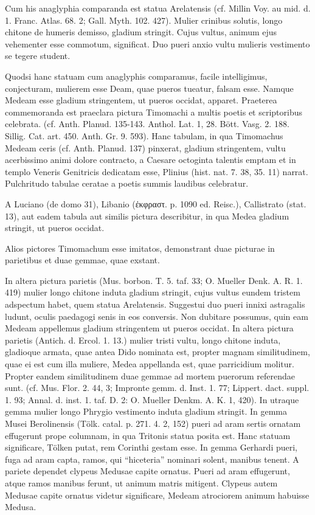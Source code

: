 \documentclass[landscape, a4paper, 11pt, oneside, polutonikogreek, german]{article}
\begin{document}
Cum his anaglyphia comparanda est statua Arelatensis (cf. Millin Voy. au mid. d. 1. Franc. Atlas. 68. 2; Gall. Myth. 102. 427). Mulier crinibus solutis, longo chitone de humeris demisso, gladium stringit. Cujus vultus, animum ejus vehementer esse commotum, significat. Duo pueri anxio vultu mulieris vestimento se tegere student.

Quodsi hanc statuam cum anaglyphis comparamus, facile intelligimus, conjecturam, mulierem esse Deam, quae pueros tueatur, falsam esse. Namque Medeam esse gladium stringentem, ut pueros occidat, apparet. Praeterea commemoranda est praeclara pictura Timomachi a multis poetis et scriptoribus celebrata. (cf. Anth. Planud. 135-143. Anthol. Lat. 1, 28. Bött. Vasg. 2. 188. Sillig. Cat. art. 450. Anth. Gr. 9. 593). Hanc tabulam, in qua Timomachus Medeam ceris (cf. Anth. Planud. 137) pinxerat, gladium stringentem, vultu acerbissimo animi dolore contracto, a Caesare octoginta talentis emptam et in templo Veneris Genitricis dedicatam esse, Plinius (hist. nat. 7. 38, 35. 11) narrat. Pulchritudo tabulae ceratae a poetis summis laudibus celebratur.

A Luciano (de domo 31), Libanio (ἐκφραστ. p. 1090 ed. Reisc.), Callistrato (stat. 13), aut eadem tabula aut similis pictura describitur, in qua Medea gladium stringit, ut pueros occidat.

Alios pictores Timomachum esse imitatos, demonstrant duae picturae in parietibus et duae gemmae, quae exstant.

In altera pictura parietis (Mus. borbon. T. 5. taf. 33; O. Mueller Denk. A. R. 1. 419) mulier longo chitone induta gladium stringit, cujus vultus eundem tristem adspectum habet, quem statua Arelatensis. Suggestui duo pueri innixi astragalis ludunt, oculis paedagogi senis in eos conversis. Non dubitare possumus, quin eam Medeam appellemus gladium stringentem ut pueros occidat. In altera pictura parietis (Antich. d. Ercol. 1. 13.) mulier tristi vultu, longo chitone induta, gladioque armata, quae antea Dido nominata est, propter magnam similitudinem, quae ei est cum illa muliere, Medea appellanda est, quae parricidium molitur. Propter eandem similitudinem duae gemmae ad mortem puerorum referendae sunt. (cf. Mus. Flor. 2. 44, 3; Impronte gemm. d. Inst. 1. 77; Lippert. dact. suppl. 1. 93; Annal. d. inst. 1. taf. D. 2: O. Mueller Denkm. A. K. 1, 420). In utraque gemma mulier longo Phrygio vestimento induta gladium stringit. In gemma Musei Berolinensis (Tölk. catal. p. 271. 4. 2, 152) pueri ad aram sertis ornatam effugerunt prope columnam, in qua Tritonis statua posita est. Hanc statuam significare, Tölken putat, rem Corinthi gestam esse. In gemma Gerhardi pueri, fuga ad aram capta, ramos, qui "`hiceteria"' nominari solent, manibus tenent. A pariete dependet clypeus Medusae capite ornatus. Pueri ad aram effugerunt, atque ramos manibus ferunt, ut animum matris mitigent. Clypeus autem Medusae capite ornatus videtur significare, Medeam atrociorem animum habuisse Medusa.
\end{document}
